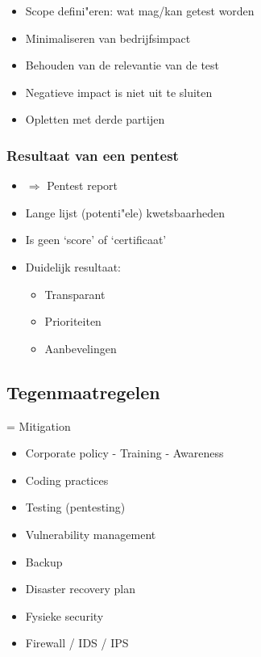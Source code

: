 \documentclass{article}
\begin{document}
\begin{itemize}
    \item Scope defini"eren: wat mag/kan getest worden
    \item Minimaliseren van bedrijfsimpact
    \item Behouden van de relevantie van de test
    \item Negatieve impact is niet uit te sluiten
    \item Opletten met derde partijen
\end{itemize}

\subsubsection{Resultaat van een pentest}

\begin{itemize}
    \item $\Rightarrow$ Pentest report
    \item Lange lijst (potenti"ele) kwetsbaarheden
    \item Is geen `score' of `certificaat'
    \item Duidelijk resultaat:
    \begin{itemize}
        \item Transparant
        \item Prioriteiten
        \item Aanbevelingen
    \end{itemize}
\end{itemize}

\subsection{Tegenmaatregelen}

= Mitigation

\begin{itemize}
    \item Corporate policy - Training - Awareness
    \item Coding practices
    \item Testing (pentesting)
    \item Vulnerability management
    \item Backup
    \item Disaster recovery plan
    \item Fysieke security
    \item Firewall / IDS / IPS
\end{itemize}
\end{document}

